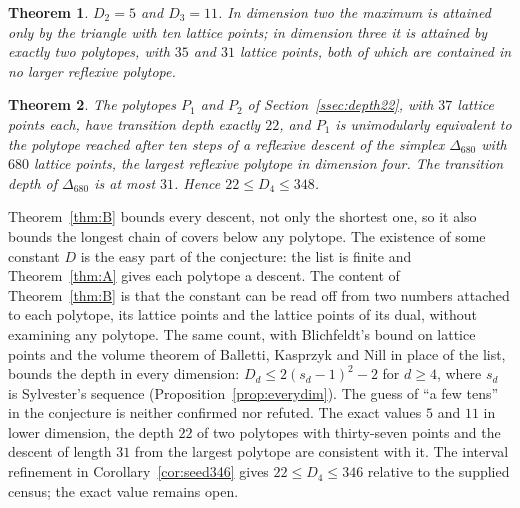 \documentclass[manuscript]{aomart}
\newtheorem{theorem}{Theorem}
\theoremstyle{definition}
\theoremstyle{remark}
\newcommand{\Dbig}{\Delta_{680}}
\newcommand{\UB}{348}
\newcommand{\LB}{22}
\newcommand{\DUB}{31}
\newcommand{\DepthUB}{346}
\begin{document}
\begin{theorem}\label{thm:C}
$D_2=5$ and $D_3=11$. In dimension two the maximum is attained only by the
triangle with ten lattice points; in dimension three it is attained by
exactly two polytopes, with $35$ and $31$ lattice points, both of which are
contained in no larger reflexive polytope.
\end{theorem}

\begin{theorem}\label{thm:D}
The polytopes $P_1$ and $P_2$ of Section~\ref{ssec:depth22}, with $37$
lattice points each, have transition depth exactly $\LB$, and $P_1$ is
unimodularly equivalent to the polytope reached after ten steps of a
reflexive descent of the simplex $\Dbig$ with $680$ lattice points, the
largest reflexive polytope in dimension four. The transition depth of
$\Dbig$ is at most $\DUB$. Hence $\LB\le D_4\le\UB$.
\end{theorem}

Theorem~\ref{thm:B} bounds every descent, not only the shortest one, so it
also bounds the longest chain of covers below any polytope. The existence
of some constant $D$ is the easy part of the conjecture: the list is finite
and Theorem~\ref{thm:A} gives each polytope a descent. The content of
Theorem~\ref{thm:B} is that the constant can be read off from two numbers
attached to each polytope, its lattice points and the lattice points of
its dual, without examining any polytope. The same count, with
Blichfeldt's bound on lattice points and the volume theorem of Balletti,
Kasprzyk and Nill in place of the list, bounds the depth in every
dimension: $D_d\le2(s_d-1)^2-2$ for $d\ge4$, where $s_d$ is Sylvester's
sequence (Proposition~\ref{prop:everydim}). The guess of ``a few tens'' in
the conjecture is neither confirmed nor refuted. The exact values $5$ and
$11$ in lower dimension, the depth $\LB$ of two polytopes with thirty-seven
points and the descent of length $\DUB$ from the largest polytope are
consistent with it. The interval refinement in Corollary~\ref{cor:seed346}
gives $\LB\le D_4\le\DepthUB$ relative to the supplied census;
the exact value remains open.
\end{document}

